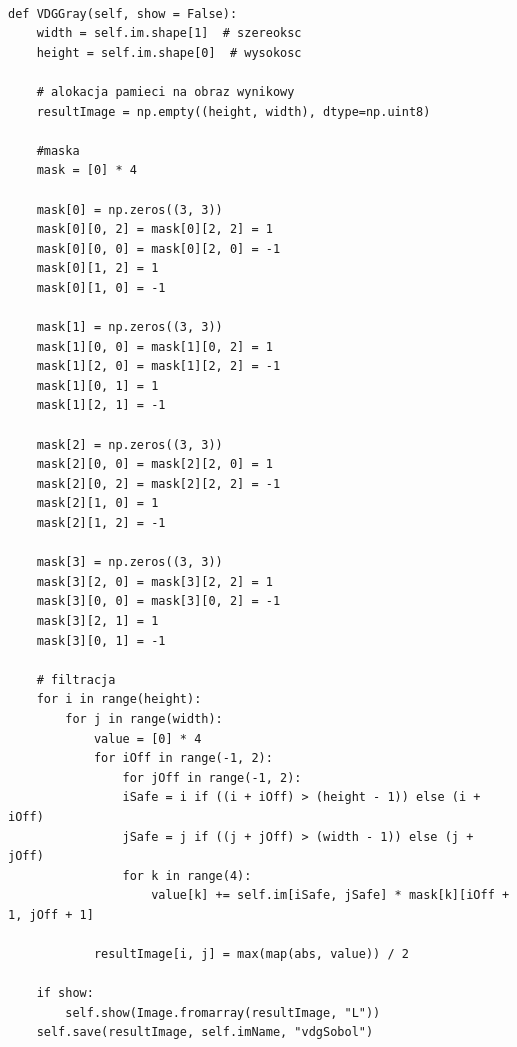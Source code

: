 \documentclass[final,a4paper,openany,12pt]{mwbk}
\begin{document}
\begin{lstlisting}[caption=Gradient wektora kierunkowego (obraz szary)]
	
def VDGGray(self, show = False):
	width = self.im.shape[1]  # szereoksc
	height = self.im.shape[0]  # wysokosc
	
	# alokacja pamieci na obraz wynikowy
	resultImage = np.empty((height, width), dtype=np.uint8)
	
	#maska
	mask = [0] * 4
	
	mask[0] = np.zeros((3, 3))
	mask[0][0, 2] = mask[0][2, 2] = 1
	mask[0][0, 0] = mask[0][2, 0] = -1
	mask[0][1, 2] = 1
	mask[0][1, 0] = -1
	
	mask[1] = np.zeros((3, 3))
	mask[1][0, 0] = mask[1][0, 2] = 1
	mask[1][2, 0] = mask[1][2, 2] = -1
	mask[1][0, 1] = 1
	mask[1][2, 1] = -1
	
	mask[2] = np.zeros((3, 3))
	mask[2][0, 0] = mask[2][2, 0] = 1
	mask[2][0, 2] = mask[2][2, 2] = -1
	mask[2][1, 0] = 1
	mask[2][1, 2] = -1
	
	mask[3] = np.zeros((3, 3))
	mask[3][2, 0] = mask[3][2, 2] = 1
	mask[3][0, 0] = mask[3][0, 2] = -1
	mask[3][2, 1] = 1
	mask[3][0, 1] = -1
	
	# filtracja
	for i in range(height):
		for j in range(width):
			value = [0] * 4
			for iOff in range(-1, 2):
				for jOff in range(-1, 2):
				iSafe = i if ((i + iOff) > (height - 1)) else (i + iOff)
				jSafe = j if ((j + jOff) > (width - 1)) else (j + jOff)
				for k in range(4):
					value[k] += self.im[iSafe, jSafe] * mask[k][iOff + 1, jOff + 1]
	
			resultImage[i, j] = max(map(abs, value)) / 2
	
	if show:
		self.show(Image.fromarray(resultImage, "L"))
	self.save(resultImage, self.imName, "vdgSobol")
	
\end{lstlisting}

\newpage
\end{document}
